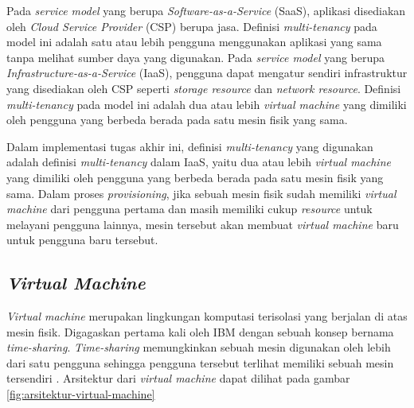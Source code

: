 Pada \emph{service model} yang berupa \emph{Software-as-a-Service} (SaaS), aplikasi
disediakan oleh \emph{Cloud Service Provider} (CSP) berupa jasa. Definisi \emph{multi-tenancy}
pada model ini adalah satu atau lebih pengguna menggunakan aplikasi yang sama tanpa melihat
sumber daya yang digunakan. Pada \emph{service model} yang berupa \emph{Infrastructure-as-a-Service} (IaaS), pengguna
dapat mengatur sendiri infrastruktur yang disediakan oleh CSP seperti \emph{storage resource} dan \emph{network resource}.
Definisi \emph{multi-tenancy} pada model ini adalah dua atau lebih \emph{virtual machine}
yang dimiliki oleh pengguna yang berbeda berada pada satu mesin fisik yang sama.

Dalam implementasi tugas akhir ini, definisi \emph{multi-tenancy} yang digunakan adalah definisi
\emph{multi-tenancy} dalam IaaS, yaitu dua atau lebih \emph{virtual machine} yang dimiliki oleh
pengguna yang berbeda berada pada satu mesin fisik yang sama. Dalam proses \emph{provisioning}, jika
sebuah mesin fisik sudah memiliki \emph{virtual machine} dari pengguna pertama dan
masih memiliki cukup \emph{resource} untuk melayani pengguna lainnya, mesin tersebut
akan membuat \emph{virtual machine} baru untuk pengguna baru tersebut.

\subsection{\emph{Virtual Machine}}
\label{sec:virtual-machine}

\emph{Virtual machine} merupakan lingkungan komputasi terisolasi
yang berjalan di atas mesin fisik. Digagaskan pertama kali oleh IBM
dengan sebuah konsep bernama \emph{time-sharing}. \emph{Time-sharing}
memungkinkan sebuah mesin digunakan oleh lebih dari satu pengguna sehingga
pengguna tersebut terlihat memiliki sebuah mesin tersendiri \parencite{ibm-website}.
Arsitektur dari \emph{virtual machine} dapat dilihat pada gambar \ref{fig:arsitektur-virtual-machine}

